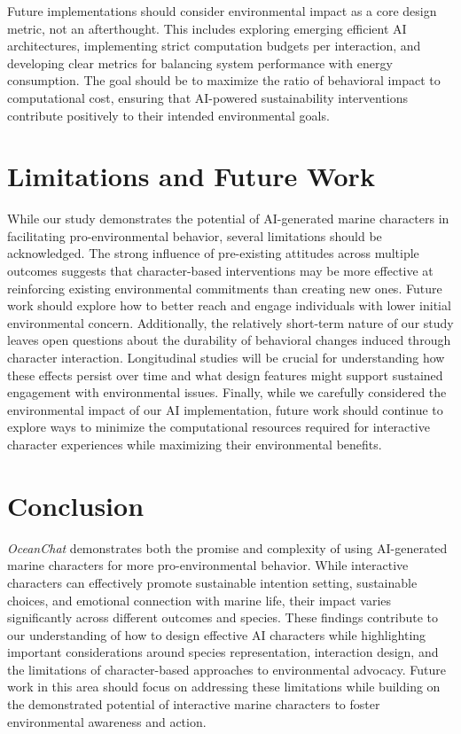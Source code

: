 \documentclass[sigconf, nonacm]{acmart}
\begin{document}
Future implementations should consider environmental impact as a core design metric, not an afterthought. This includes exploring emerging efficient AI architectures, implementing strict computation budgets per interaction, and developing clear metrics for balancing system performance with energy consumption. The goal should be to maximize the ratio of behavioral impact to computational cost, ensuring that AI-powered sustainability interventions contribute positively to their intended environmental goals.

\section{Limitations and Future Work}
While our study demonstrates the potential of AI-generated marine characters in facilitating pro-environmental behavior, several limitations should be acknowledged. The strong influence of pre-existing attitudes across multiple outcomes suggests that character-based interventions may be more effective at reinforcing existing environmental commitments than creating new ones. Future work should explore how to better reach and engage individuals with lower initial environmental concern. Additionally, the relatively short-term nature of our study leaves open questions about the durability of behavioral changes induced through character interaction. Longitudinal studies will be crucial for understanding how these effects persist over time and what design features might support sustained engagement with environmental issues. Finally, while we carefully considered the environmental impact of our AI implementation, future work should continue to explore ways to minimize the computational resources required for interactive character experiences while maximizing their environmental benefits.

\section{Conclusion}
\textit{OceanChat} demonstrates both the promise and complexity of using AI-generated marine characters for more pro-environmental behavior. While interactive characters can effectively promote sustainable intention setting, sustainable choices, and emotional connection with marine life, their impact varies significantly across different outcomes and species. These findings contribute to our understanding of how to design effective AI characters while highlighting important considerations around species representation, interaction design, and the limitations of character-based approaches to environmental advocacy. Future work in this area should focus on addressing these limitations while building on the demonstrated potential of interactive marine characters to foster environmental awareness and action.



\end{document}
